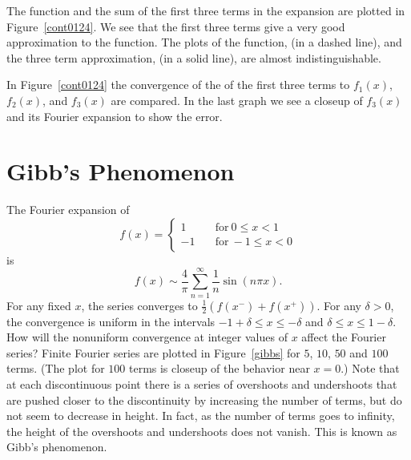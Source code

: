 \begin{Example}
  The function and the sum of the first three terms in the expansion are plotted
  in Figure~\ref{cont0124}.  We see that the first three terms give a very good
  approximation to the function. The plots of the function, (in a dashed line),
  and the three term approximation, (in a solid line), are almost 
  indistinguishable.

  In Figure~\ref{cont0124} the convergence of the of the first three terms to
  $f_1(x)$, $f_2(x)$, and $f_3(x)$ are compared.  In the last graph we see a 
  closeup of $f_3(x)$ and its Fourier expansion to show the error.





\end{Example}


















\section{Gibb's Phenomenon}
The Fourier expansion of
\[ f(x) = 
\begin{cases}
  1 \quad &\mathrm{for}\ 0 \leq x < 1 \\
  -1 \quad &\mathrm{for}\ -1 \leq x < 0
\end{cases}
\]
is
\[ f(x) \sim \frac{4}{\pi} \sum_{n = 1}^\infty \frac{1}{n} \sin(n \pi x).\]
For any fixed $x$, the series converges to $\frac{1}{2}(f(x^-)+f(x^+))$.
For any $\delta > 0$, the convergence is uniform in the intervals
$-1+\delta \leq x \leq -\delta$ and $\delta \leq x \leq 1 - \delta$.
How will the nonuniform convergence at integer values of $x$
affect the Fourier series?
Finite Fourier series are plotted in Figure~\ref{gibbs} for $5$, $10$, $50$
and $100$ terms. (The plot for $100$ terms is closeup of the behavior 
near $x=0$.)  Note that at each discontinuous point there is a series of
overshoots and undershoots that are pushed closer to the discontinuity
by increasing the number of terms, but do not seem to decrease in height.
In fact, as the number of terms goes to infinity, the height of the
overshoots and undershoots does not vanish.  This is known as
Gibb's phenomenon.  


